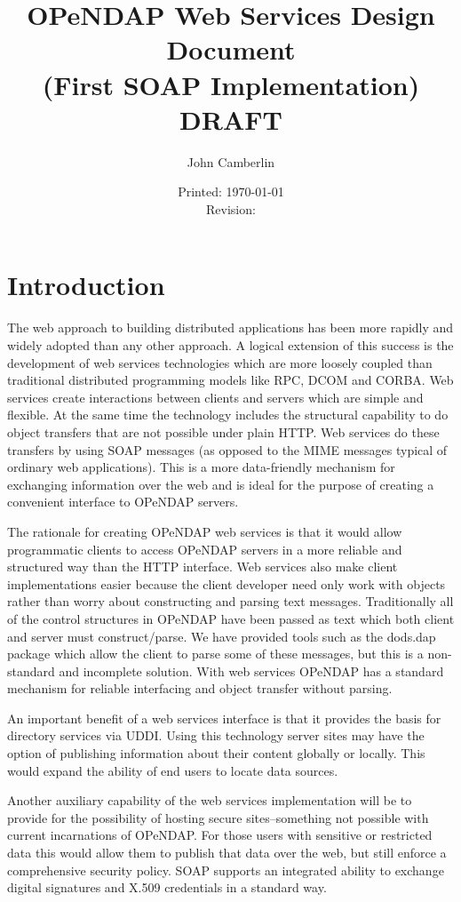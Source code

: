 \documentclass[justify]{dods-paper}
\title{OPeNDAP Web Services Design Document\\(First SOAP Implementation)\\ DRAFT}
\author{John Camberlin}
\date{Printed: \today \\ Revision: \rcsInfoRevision}
\begin{document}
\maketitle


\section{Introduction}

The web approach to building distributed applications has been more rapidly and widely adopted than any other approach. A logical extension of this success is the development of web services technologies which are more loosely coupled than traditional distributed programming models like RPC, DCOM and CORBA. Web services create interactions between clients and servers which are simple and flexible. At the same time the technology includes the structural capability to do object transfers that are not possible under plain HTTP. Web services do these transfers by using SOAP messages (as opposed to the MIME messages typical of ordinary web applications). This is a more data-friendly mechanism for exchanging information over the web and is ideal for the purpose of creating a convenient interface to OPeNDAP servers.

The rationale for creating OPeNDAP web services is that it would allow programmatic clients to access OPeNDAP servers in a more reliable and structured way than the HTTP interface. Web services also make client implementations easier because the client developer need only work with objects rather than worry about constructing and parsing text messages. Traditionally all of the control structures in OPeNDAP have been passed as text which both client and server must construct/parse. We have provided tools such as the dods.dap package which allow the client to parse some of these messages, but this is a non-standard and incomplete solution. With web services OPeNDAP has a standard mechanism for reliable interfacing and object transfer without parsing.

An important benefit of a web services interface is that it provides the basis for directory services via UDDI. Using this technology server sites may have the option of publishing information about their content globally or locally. This would expand the ability of end users to locate data sources.

Another auxiliary capability of the web services implementation will be to provide for the possibility of hosting secure sites--something not possible with current incarnations of OPeNDAP. For those users with sensitive or restricted data this would allow them to publish that data over the web, but still enforce a comprehensive security policy. SOAP supports an integrated ability to exchange digital signatures and X.509 credentials in a standard way.
\end{document}
